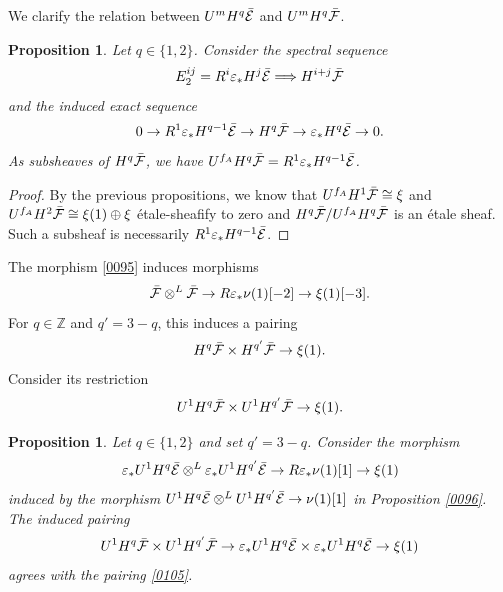 \documentclass{amsart}
\newtheorem{Prop}[Thm]{Proposition}
\theoremstyle{remark}
\numberwithin{equation}{subsection}
\newcommand{\tensor}{\mathbin{\otimes}}
\newcommand{\Z}{\mathbb{Z}}
\begin{document}
We clarify the relation between $U^{m} H^{q} \Bar{\mathcal{E}}$ and $U^{m} H^{q} \Bar{\mathcal{F}}$.

\begin{Prop} \label{0104}
	Let $q \in \{1, 2\}$.
	Consider the spectral sequence
		\[
				E_{2}^{i j}
			=
				R^{i} \varepsilon_{\ast} H^{j} \Bar{\mathcal{E}}
			\Longrightarrow
				H^{i + j} \Bar{\mathcal{F}}
		\]
	and the induced exact sequence
		\[
				0
			\to
				R^{1} \varepsilon_{\ast} H^{q - 1} \Bar{\mathcal{E}}
			\to
				H^{q} \Bar{\mathcal{F}}
			\to
				\varepsilon_{\ast} H^{q} \Bar{\mathcal{E}}
			\to
				0.
		\]
	As subsheaves of $H^{q} \Bar{\mathcal{F}}$, we have
	$U^{f_{A}} H^{q} \Bar{\mathcal{F}} = R^{1} \varepsilon_{\ast} H^{q - 1} \Bar{\mathcal{E}}$.
\end{Prop}

\begin{proof}
	By the previous propositions,
	we know that $U^{f_{A}} H^{1} \Bar{\mathcal{F}} \cong \xi$
	and $U^{f_{A}} H^{2} \Bar{\mathcal{F}} \cong \xi(1) \oplus \xi$ \'etale-sheafify to zero
	and $H^{q} \Bar{\mathcal{F}} / U^{f_{A}} H^{q} \Bar{\mathcal{F}}$ is an \'etale sheaf.
	Such a subsheaf is necessarily $R^{1} \varepsilon_{\ast} H^{q - 1} \Bar{\mathcal{E}}$.
\end{proof}

The morphism \eqref{0095} induces morphisms
	\[
			\Bar{\mathcal{F}} \tensor^{L} \Bar{\mathcal{F}}
		\to
			R \varepsilon_{\ast} \nu(1)[-2]
		\to
			\xi(1)[-3].
	\]
For $q \in \Z$ and $q' = 3 - q$, this induces a pairing
	\begin{equation} \label{0353}
			H^{q} \Bar{\mathcal{F}} \times H^{q'} \Bar{\mathcal{F}}
		\to
			\xi(1).
	\end{equation}
Consider its restriction
	\begin{equation} \label{0105}
			U^{1} H^{q} \Bar{\mathcal{F}} \times U^{1} H^{q'} \Bar{\mathcal{F}}
		\to
			\xi(1).
	\end{equation}

\begin{Prop} \label{0272}
	Let $q \in \{1, 2\}$ and set $q' = 3 - q$.
	Consider the morphism
		\[
					\varepsilon_{\ast} U^{1} H^{q} \Bar{\mathcal{E}}
				\tensor^{L}
					\varepsilon_{\ast} U^{1} H^{q'} \Bar{\mathcal{E}}
			\to
				R \varepsilon_{\ast} \nu(1)[1]
			\to
				\xi(1)
		\]
	induced by the morphism
	$U^{1} H^{q} \Bar{\mathcal{E}} \tensor^{L} U^{1} H^{q'} \Bar{\mathcal{E}} \to \nu(1)[1]$
	in Proposition \ref{0096}.
	The induced pairing
		\begin{equation} \label{0515}
					U^{1} H^{q} \Bar{\mathcal{F}}
				\times
					U^{1} H^{q'} \Bar{\mathcal{F}}
			\to
					\varepsilon_{\ast} U^{1} H^{q} \Bar{\mathcal{E}}
				\times
					\varepsilon_{\ast} U^{1} H^{q} \Bar{\mathcal{E}}
			\to
				\xi(1)
		\end{equation}
	agrees with the pairing \eqref{0105}.
\end{Prop}
\end{document}
